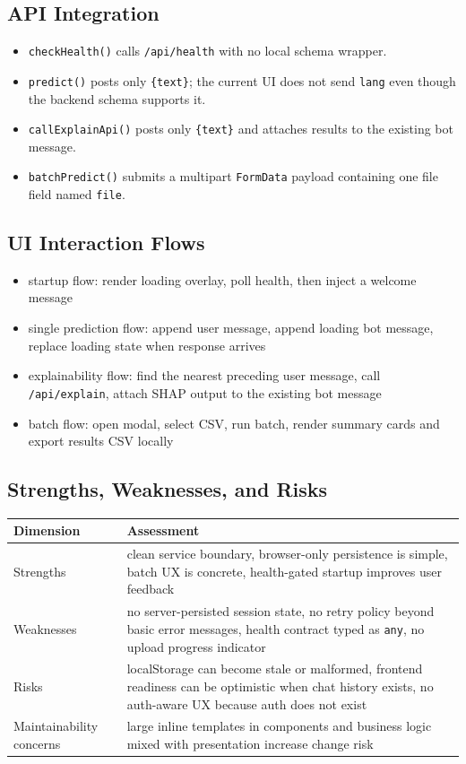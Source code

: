 \subsection{API Integration}
\begin{itemize}[leftmargin=1.2em]
  \item \texttt{checkHealth()} calls \texttt{/api/health} with no local schema wrapper.
  \item \texttt{predict()} posts only \texttt{\{text\}}; the current UI does not send \texttt{lang} even though the backend schema supports it.
  \item \texttt{callExplainApi()} posts only \texttt{\{text\}} and attaches results to the existing bot message.
  \item \texttt{batchPredict()} submits a multipart \texttt{FormData} payload containing one file field named \texttt{file}.
\end{itemize}

\subsection{UI Interaction Flows}
\begin{itemize}[leftmargin=1.2em]
  \item startup flow: render loading overlay, poll health, then inject a welcome message
  \item single prediction flow: append user message, append loading bot message, replace loading state when response arrives
  \item explainability flow: find the nearest preceding user message, call \texttt{/api/explain}, attach SHAP output to the existing bot message
  \item batch flow: open modal, select CSV, run batch, render summary cards and export results CSV locally
\end{itemize}

\subsection{Strengths, Weaknesses, and Risks}
\begin{table}[H]
\centering
\begin{tabularx}{\textwidth}{@{}lX@{}}
\toprule
\textbf{Dimension} & \textbf{Assessment} \\
\midrule
Strengths & clean service boundary, browser-only persistence is simple, batch UX is concrete, health-gated startup improves user feedback \\
Weaknesses & no server-persisted session state, no retry policy beyond basic error messages, health contract typed as \texttt{any}, no upload progress indicator \\
Risks & localStorage can become stale or malformed, frontend readiness can be optimistic when chat history exists, no auth-aware UX because auth does not exist \\
Maintainability concerns & large inline templates in components and business logic mixed with presentation increase change risk \\
\bottomrule
\end{tabularx}
\end{table}


